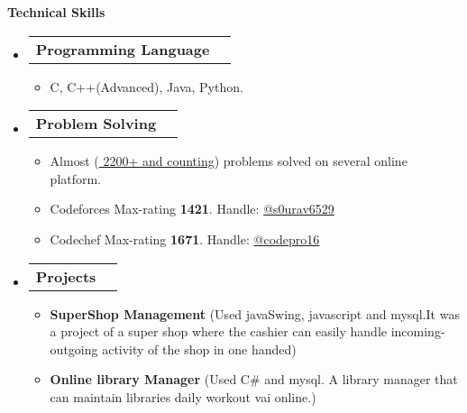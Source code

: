 \documentclass[legalpaper,10pt]{article}
\makeatletter
\newcommand{\resheading}[1]{{\large \colorbox{mygrey}{\begin{minipage}{\textwidth}{\textbf{#1 \vphantom{p\^{E}}}}\end{minipage}}}}
\newcommand{\ressubheading}[4]{
	\begin{tabular*}{7.1in}{l@{\extracolsep{\fill}}r}
		\textbf{#1} & \textit{#4} \\
	\end{tabular*}\vspace{-6pt}}
\makeatother
\begin{document}
	\resheading{Technical Skills}
        \begin{itemize}  
            \vspace{0.10in}
            \item \ressubheading{Programming Language}{}{}{}
		\begin{itemize}
			\item C, C++(Advanced), Java, Python.
		\end{itemize}

            \item \ressubheading{Problem Solving}{}{}{}
		\begin{itemize}
                \item Almost (\href{https://www.stopstalk.com/user/profile/Sourav_sCodes}{ 2200+ and  counting}) problems solved on several online platform.
			\item Codeforces Max-rating \textbf{1421}. Handle:           \href{https://codeforces.com/profile/s0urav6529}{@s0urav6529} 
                \item Codechef Max-rating \textbf{1671}. Handle: \href{https://www.codechef.com/users/codepro16}{@codepro16} 
		\end{itemize}

            \item \ressubheading{Projects}{}{}{}
		\begin{itemize}
                \item \textbf{SuperShop Management} (Used javaSwing, javascript and mysql.It was a project of a super shop where the cashier can easily handle incoming-outgoing activity of the shop in one handed)
		\end{itemize}
            \begin{itemize}
                \item \textbf{Online library Manager} (Used C\# and mysql. A library manager that can maintain libraries daily workout vai online.)
		\end{itemize}
	\end{itemize}

	\vspace{0.25in}
\end{document}

